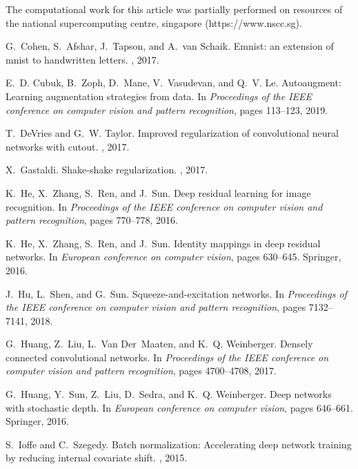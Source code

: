 \documentclass[11pt]{article}
\begin{document}
\begin{thebibliography}{10}

The computational work for this article was partially performed on resources of
  the national supercomputing centre, singapore (https://www.nscc.sg).

G.~Cohen, S.~Afshar, J.~Tapson, and A.~van Schaik.
\newblock Emnist: an extension of mnist to handwritten letters.
, 2017.

E.~D. Cubuk, B.~Zoph, D.~Mane, V.~Vasudevan, and Q.~V. Le.
\newblock Autoaugment: Learning augmentation strategies from data.
\newblock In {\em Proceedings of the IEEE conference on computer vision and
  pattern recognition}, pages 113--123, 2019.

T.~DeVries and G.~W. Taylor.
\newblock Improved regularization of convolutional neural networks with cutout.
, 2017.

X.~Gastaldi.
\newblock Shake-shake regularization.
, 2017.

K.~He, X.~Zhang, S.~Ren, and J.~Sun.
\newblock Deep residual learning for image recognition.
\newblock In {\em Proceedings of the IEEE conference on computer vision and
  pattern recognition}, pages 770--778, 2016.

K.~He, X.~Zhang, S.~Ren, and J.~Sun.
\newblock Identity mappings in deep residual networks.
\newblock In {\em European conference on computer vision}, pages 630--645.
  Springer, 2016.

J.~Hu, L.~Shen, and G.~Sun.
\newblock Squeeze-and-excitation networks.
\newblock In {\em Proceedings of the IEEE conference on computer vision and
  pattern recognition}, pages 7132--7141, 2018.

G.~Huang, Z.~Liu, L.~Van Der~Maaten, and K.~Q. Weinberger.
\newblock Densely connected convolutional networks.
\newblock In {\em Proceedings of the IEEE conference on computer vision and
  pattern recognition}, pages 4700--4708, 2017.

G.~Huang, Y.~Sun, Z.~Liu, D.~Sedra, and K.~Q. Weinberger.
\newblock Deep networks with stochastic depth.
\newblock In {\em European conference on computer vision}, pages 646--661.
  Springer, 2016.

S.~Ioffe and C.~Szegedy.
\newblock Batch normalization: Accelerating deep network training by reducing
  internal covariate shift.
, 2015.


\end{thebibliography}
\end{document}

